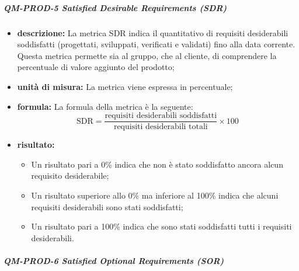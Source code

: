 			\subparagraph{QM-PROD-5 Satisfied Desirable Requirements (SDR)}

			\begin{itemize}
      			\item \textbf{descrizione: }
				La metrica SDR indica il quantitativo di requisiti desiderabili soddisfatti (progettati, sviluppati, verificati e validati) fino alla data corrente. Questa metrica permette sia al gruppo, che al cliente, di comprendere la percentuale di valore aggiunto del prodotto;

				\item \textbf{unità di misura: }
				La metrica viene espressa in percentuale;

				\item \textbf{formula: }
				La formula della metrica è la seguente:
				\[
					\text{SDR} = \frac{\text{requisiti desiderabili soddisfatti}}{\text{requisiti desiderabili totali}} \times 100
				\]

				\item \textbf{risultato: }
				\begin{itemize}
					\item Un risultato pari a 0\% indica che non è stato soddisfatto ancora alcun requisito desiderabile;
					\item Un risultato superiore allo 0\% ma inferiore al 100\% indica che alcuni requisiti desiderabili sono stati soddisfatti;
					\item Un risultato pari a 100\% indica che sono stati soddisfatti tutti i requisiti desiderabili.
				\end{itemize}
			\end{itemize}

			\subparagraph{QM-PROD-6 Satisfied Optional Requirements (SOR)}

